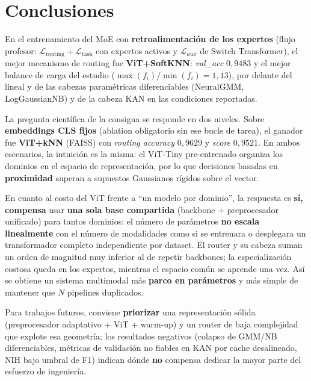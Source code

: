 \documentclass[conference]{IEEEtran}
\begin{document}
\section{Conclusiones}

En el entrenamiento del MoE con \textbf{retroalimentación de los expertos} (flujo profesor: $\mathcal{L}_{\text{routing}} + \mathcal{L}_{\text{task}}$ con expertos activos y $\mathcal{L}_{aux}$ de Switch Transformer), el mejor mecanismo de routing fue \textbf{ViT+SoftKNN}: \textit{val\_acc} $0{,}9483$ y el mejor balance de carga del estudio ($\max(f_i)/\min(f_i)=1{,}13$), por delante del lineal y de las cabezas paramétricas diferenciables (NeuralGMM, LogGaussianNB) y de la cabeza KAN en las condiciones reportadas.

La pregunta científica de la consigna se responde en dos niveles. Sobre \textbf{embeddings CLS fijos} (ablation obligatorio sin ese bucle de tarea), el ganador fue \textbf{ViT+k\textendash NN} (FAISS) con \textit{routing accuracy} $0{,}9629$ y \textit{score} $0{,}9521$. En ambos escenarios, la intuición es la misma: el ViT-Tiny pre-entrenado organiza los dominios en el espacio de representación, por lo que decisiones basadas en \textbf{proximidad} superan a supuestos Gaussianos rígidos sobre el vector.

En cuanto al costo del ViT frente a ``un modelo por dominio'', la respuesta es \textbf{sí, compensa} usar \textbf{una sola base compartida} (backbone + preprocesador unificado) para tantos dominios: el número de parámetros \textbf{no escala linealmente} con el número de modalidades como si se entrenara o desplegara un transformador completo independiente por dataset. El router y su cabeza suman un orden de magnitud muy inferior al de repetir backbones; la especialización costosa queda en los expertos, mientras el espacio común se aprende una vez. Así se obtiene un sistema multimodal más \textbf{parco en parámetros} y más simple de mantener que $N$ pipelines duplicados.

Para trabajos futuros, conviene \textbf{priorizar} una representación sólida (preprocesador adaptativo + ViT + warm-up) y un router de baja complejidad que explote esa geometría; los resultados negativos (colapso de GMM/NB diferenciables, métricas de validación no fiables en KAN por cache desalineado, NIH bajo umbral de F1) indican dónde \textbf{no} compensa dedicar la mayor parte del esfuerzo de ingeniería.
\end{document}
